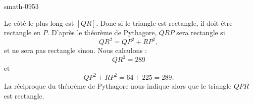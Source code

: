 
\begin{corrige}{smath-0953}

    Le côté le plus long est \( [QR]\). Donc si le triangle est rectangle, il doit être rectangle en \( P\). D'après le théorème de Pythagore, \( QRP\) sera rectangle si 
    \begin{equation}
        QR^2=QP^2+RP^2,
    \end{equation}
    et ne sera pas rectangle sinon. Nous calculons :
    \begin{equation}
        QR^2=289
    \end{equation}
    et
    \begin{equation}
        QP^2+RP^2=64+225=289.
    \end{equation}
    La réciproque du théorème de Pythagore nous indique alors que le triangle \( QPR\) est rectangle.

\end{corrige}
